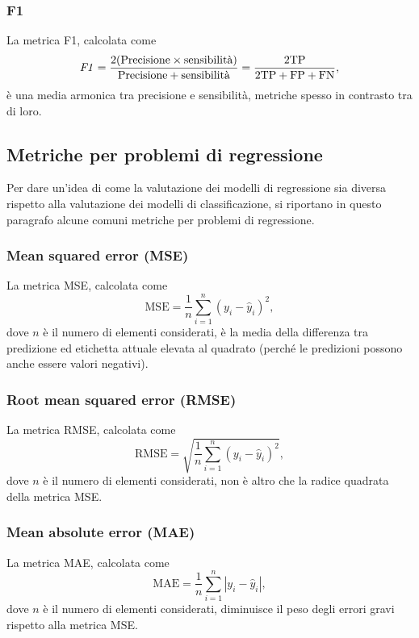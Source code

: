 \subsubsection{F1} La metrica F1, calcolata come 
\begin{equation*}
    \textrm{\emph{F1}} = \frac{2(\text{Precisione} \times \text{sensibilità})}{\text{Precisione} + \text{sensibilità}} = \frac{2\text{TP}}{2\text{TP}+ \text{FP}+ \text{FN}},
\end{equation*}
è una media armonica tra precisione e sensibilità, metriche spesso in contrasto tra di loro. 

\subsection{Metriche per problemi di regressione}
Per dare un'idea di come la valutazione dei modelli di regressione sia diversa rispetto alla valutazione dei modelli di classificazione, si riportano in questo paragrafo alcune comuni metriche per problemi di regressione. 

\subsubsection{Mean squared error (MSE)}
La metrica MSE, calcolata come
\begin{equation*}
    \textrm{MSE} = \frac{1}{n} \sum_{i=1}^{n} (y_i - \hat{y}_i)^2,
\end{equation*}
dove $n$ è il numero di elementi considerati, è la media della differenza tra predizione ed etichetta attuale elevata al quadrato (perché le predizioni possono anche essere valori negativi).

\subsubsection{Root mean squared error (RMSE)}
La metrica RMSE, calcolata come
\begin{equation*}    
    \textrm{RMSE} = \sqrt{\frac{1}{n} \sum_{i=1}^{n} (y_i - \hat{y}_i)^2},
\end{equation*}
dove $n$ è il numero di elementi considerati, non è altro che la radice quadrata della metrica MSE.

\subsubsection{Mean absolute error (MAE)}
La metrica MAE, calcolata come
\begin{equation*}    
    \textrm{MAE} = \frac{1}{n} \sum_{i=1}^{n} |y_i - \hat{y}_i|,
\end{equation*}
dove $n$ è il numero di elementi considerati, diminuisce il peso degli errori gravi rispetto alla metrica MSE.

